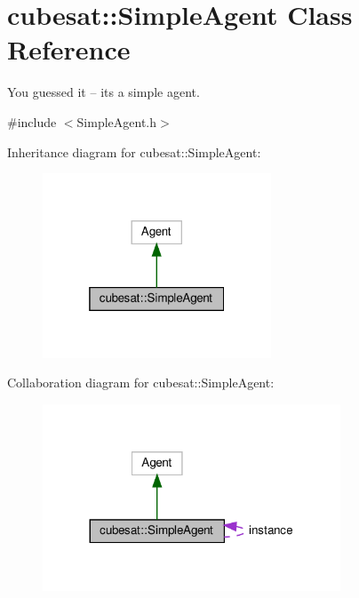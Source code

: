 \hypertarget{classcubesat_1_1SimpleAgent}{}\section{cubesat\+:\+:Simple\+Agent Class Reference}
\label{classcubesat_1_1SimpleAgent}


You guessed it -- it\textquotesingle{}s a simple agent.  




{\ttfamily \#include $<$Simple\+Agent.\+h$>$}



Inheritance diagram for cubesat\+:\+:Simple\+Agent\+:\nopagebreak
\begin{figure}[H]
\begin{center}
\leavevmode
\includegraphics[width=193pt]{classcubesat_1_1SimpleAgent__inherit__graph}
\end{center}
\end{figure}


Collaboration diagram for cubesat\+:\+:Simple\+Agent\+:\nopagebreak
\begin{figure}[H]
\begin{center}
\leavevmode
\includegraphics[width=251pt]{classcubesat_1_1SimpleAgent__coll__graph}
\end{center}
\end{figure}
